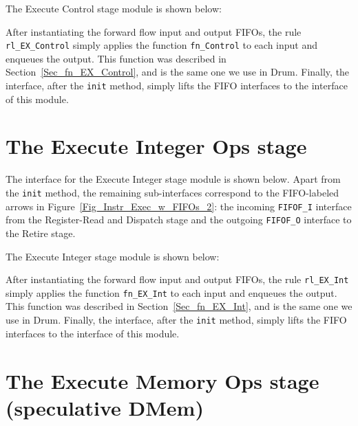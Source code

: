 

The Execute Control stage module is shown below:



After instantiating the forward flow input and output FIFOs, the rule
\verb|rl_EX_Control| simply applies the function \verb|fn_Control| to
each input and enqueues the output.  This function was described in
Section~\ref{Sec_fn_EX_Control}, and is the same one we use in Drum.
Finally, the interface, after the \verb|init| method, simply lifts the
FIFO interfaces to the interface of this module.


\section{The Execute Integer Ops stage}

\label{Sec_Fife_EX_Int_stage}

The interface for the Execute Integer stage module is shown below.
Apart from the \verb|init| method, the remaining sub-interfaces
correspond to the FIFO-labeled arrows in
Figure~\ref{Fig_Instr_Exec_w_FIFOs_2}: the incoming \verb|FIFOF_I|
interface from the Register-Read and Dispatch stage and the outgoing
\verb|FIFOF_O| interface to the Retire stage.



The Execute Integer stage module is shown below:



After instantiating the forward flow input and output FIFOs, the rule
\verb|rl_EX_Int| simply applies the function \verb|fn_EX_Int| to each
input and enqueues the output.  This function was described in
Section~\ref{Sec_fn_EX_Int}, and is the same one we use in Drum.
Finally, the interface, after the \verb|init| method, simply lifts the
FIFO interfaces to the interface of this module.


\section{The Execute Memory Ops stage (speculative DMem)}

\label{Sec_Fife_DMem_stage}

